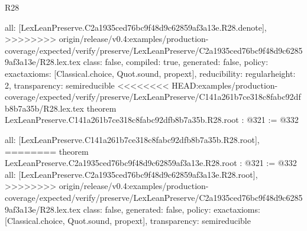 \begin{lexlean}{R28}
\begin{coremodule}
{{{{{  all: [LexLeanPreserve.C2a1935ced76bc9f48d9c62859af3a13e.R28.denote],
>>>>>>>> origin/release/v0.4:examples/production-coverage/expected/verify/preserve/LexLeanPreserve/C2a1935ced76bc9f48d9c62859af3a13e/R28.lex.tex
  class: false,
  compiled: true,
  generated: false,
  policy: exact{axioms: [Classical.choice, Quot.sound, propext]},
  reducibility: regular{height: 2},
  transparency: semireducible
}
<<<<<<<< HEAD:examples/production-coverage/expected/verify/preserve/LexLeanPreserve/C141a261b7ce318c8fabc92dfb8b7a35b/R28.lex.tex
theorem LexLeanPreserve.C141a261b7ce318c8fabc92dfb8b7a35b.R28.root : @321 := @332 {
  all: [LexLeanPreserve.C141a261b7ce318c8fabc92dfb8b7a35b.R28.root],
========
theorem LexLeanPreserve.C2a1935ced76bc9f48d9c62859af3a13e.R28.root : @321 := @332 {
  all: [LexLeanPreserve.C2a1935ced76bc9f48d9c62859af3a13e.R28.root],
>>>>>>>> origin/release/v0.4:examples/production-coverage/expected/verify/preserve/LexLeanPreserve/C2a1935ced76bc9f48d9c62859af3a13e/R28.lex.tex
  class: false,
  generated: false,
  policy: exact{axioms: [Classical.choice, Quot.sound, propext]},
  transparency: semireducible
}

}}}}}
\end{coremodule}
\end{lexlean}
